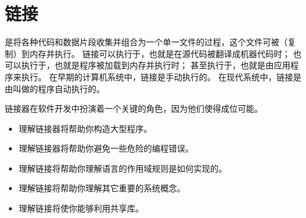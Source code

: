 
\chapter{链接}
{
    是将各种代码和数据片段收集并组合为一个单一文件的过程，这个文件可被（复制）到内存并执行。
    链接可以执行于，也就是在源代码被翻译成机器代码时；
    也可以执行于，也就是程序被加载到内存并执行时；
    甚至执行于，也就是由应用程序来执行。
    在早期的计算机系统中，链接是手动执行的。
    在现代系统中，链接是由叫做的程序自动执行的。

    链接器在软件开发中扮演着一个关键的角色，因为他们使得成位可能。

    \begin{itemize}
        \item 理解链接器将帮助你构造大型程序。
        \item 理解链接器将帮助你避免一些危险的编程错误。
        \item 理解链接将帮助你理解语言的作用域规则是如何实现的。
        \item 理解链接将帮助你理解其它重要的系统概念。
        \item 理解链接将使你能够利用共享库。
    \end{itemize}

    
    
    
    
    
    
    
    
    
    
    
    
    
    
    
}

\cleardoublepage

\endinput
